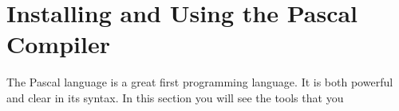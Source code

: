 \clearpage
\def\pageLang{pas}
\section{Installing and Using the Pascal Compiler} %
\label{sec:the_pascal_compiler}

The Pascal language is a great first programming language. It is both powerful and clear in its syntax. In this section you will see the tools that you 






